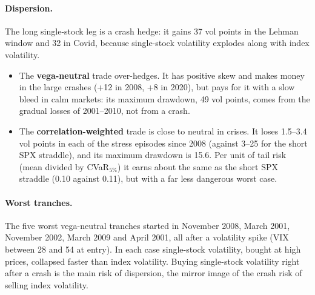 \paragraph{Dispersion.} The long single-stock leg is a crash hedge: it gains 37 vol points in the Lehman window and 32 in Covid, because single-stock volatility explodes along with index volatility.
\begin{itemize}
  \item The \textbf{vega-neutral} trade over-hedges. It has positive skew and makes money in the large crashes (+12 in 2008, +8 in 2020), but pays for it with a slow bleed in calm markets: its maximum drawdown, 49 vol points, comes from the gradual losses of 2001--2010, not from a crash.
  \item The \textbf{correlation-weighted} trade is close to neutral in crises. It loses 1.5--3.4 vol points in each of the stress episodes since 2008 (against 3--25 for the short SPX straddle), and its maximum drawdown is 15.6. Per unit of tail risk (mean divided by CVaR$_{5\%}$) it earns about the same as the short SPX straddle (0.10 against 0.11), but with a far less dangerous worst case.
\end{itemize}

\paragraph{Worst tranches.} The five worst vega-neutral tranches started in November 2008, March 2001, November 2002, March 2009 and April 2001, all after a volatility spike (VIX between 28 and 54 at entry). In each case single-stock volatility, bought at high prices, collapsed faster than index volatility. Buying single-stock volatility right after a crash is the main risk of dispersion, the mirror image of the crash risk of selling index volatility.

